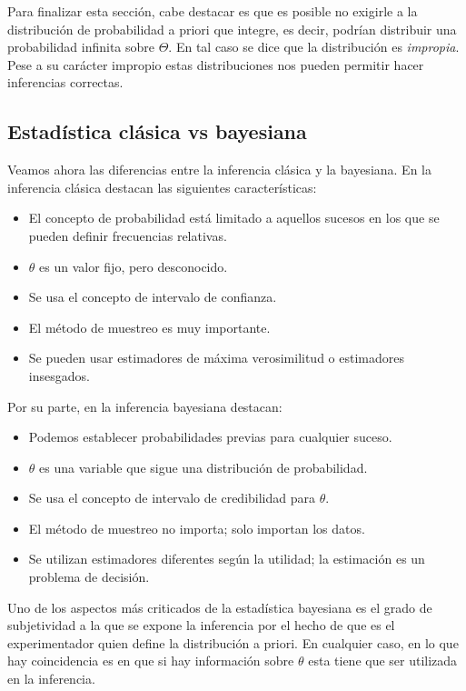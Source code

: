 \documentclass{article}
\begin{document}
Para finalizar esta sección, cabe destacar es que es posible no exigirle a la distribución de probabilidad a priori que integre, es decir, podrían distribuir una probabilidad infinita sobre $\Theta$. En tal caso se dice que la distribución es \textit{impropia}. Pese a su carácter impropio estas distribuciones nos pueden permitir hacer inferencias correctas.


\subsection{Estadística clásica vs bayesiana}

Veamos ahora las diferencias entre la inferencia clásica y la bayesiana. En la inferencia clásica destacan las siguientes características:

\begin{itemize}
	\item El concepto de probabilidad está limitado a aquellos sucesos en los que se pueden definir frecuencias relativas.
	\item $\theta$ es un valor fijo, pero desconocido.
	\item Se usa el concepto de intervalo de confianza.%
	\item El método de muestreo es muy importante.
	\item Se pueden usar estimadores de máxima verosimilitud o estimadores insesgados.
\end{itemize}

Por su parte, en la inferencia bayesiana destacan:

\begin{itemize}
	\item Podemos establecer probabilidades previas para cualquier suceso.
	\item $\theta$ es una variable que sigue una distribución de probabilidad.
	\item Se usa el concepto de intervalo de credibilidad para $\theta$.%
	\item El método de muestreo no importa; solo importan los datos.
	\item Se utilizan estimadores diferentes según la utilidad; la estimación es un problema de decisión.
\end{itemize}

Uno de los aspectos más criticados de la estadística bayesiana es el grado de subjetividad a la que se expone la inferencia por el hecho de que es el experimentador quien define la distribución a priori. En cualquier caso, en lo que hay coincidencia es en que si hay información sobre $\theta$ esta tiene que ser utilizada en la inferencia.
\end{document}
